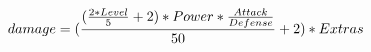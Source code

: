 \documentclass[preview]{standalone}
\begin{document}
\begin{align*}
\special{dvisvgm:raw <g id='unique000'>}damage = (\frac{(\frac{2 * Level}{5} + 2) * Power * \frac{Attack}{Defense}}{50} + 2) * Extras\special{dvisvgm:raw </g>}
\end{align*}
\end{document}
